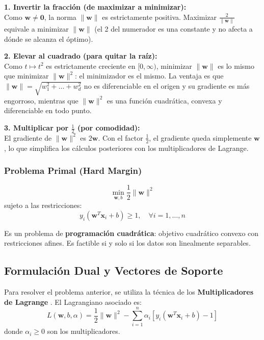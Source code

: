 \documentclass[12pt, a4paper]{article}
\begin{document}
\begin{tcolorbox}[colback=blue!5!white,colframe=blue!75!black,title=\textbf{Nota Aclaratoria: ¿Por qué minimizamos $\frac{1}{2}\|\mathbf{w}\|^2$?}]

\textbf{1. Invertir la fracción (de maximizar a minimizar):}\\
Como $\mathbf{w} \neq \mathbf{0}$, la norma $\|\mathbf{w}\|$ es estrictamente positiva. Maximizar $\frac{2}{\|\mathbf{w}\|}$ equivale a minimizar $\|\mathbf{w}\|$ (el 2 del numerador es una constante y no afecta a dónde se alcanza el óptimo).

\textbf{2. Elevar al cuadrado (para quitar la raíz):}\\
Como $t \mapsto t^2$ es estrictamente creciente en $[0, \infty)$, minimizar $\|\mathbf{w}\|$ es lo mismo que minimizar $\|\mathbf{w}\|^2$: el minimizador es el mismo. La ventaja es que $\|\mathbf{w}\| = \sqrt{w_1^2 + \dots + w_d^2}$ no es diferenciable en el origen y su gradiente es más engorroso, mientras que $\|\mathbf{w}\|^2$ es una función cuadrática, convexa y diferenciable en todo punto.

\textbf{3. Multiplicar por $\frac{1}{2}$ (por comodidad):}\\
El gradiente de $\|\mathbf{w}\|^2$ es $2\mathbf{w}$. Con el factor $\frac{1}{2}$, el gradiente queda simplemente $\mathbf{w}$, lo que simplifica los cálculos posteriores con los multiplicadores de Lagrange.
\end{tcolorbox}

\subsubsection{Problema Primal (Hard Margin)}
\[ \min_{\mathbf{w}, b} \frac{1}{2} \|\mathbf{w}\|^2 \]
sujeto a las restricciones:
\[ y_i(\mathbf{w}^T \mathbf{x}_i + b) \geq 1, \quad \forall i=1, \dots, n \]

\noindent Es un problema de \textbf{programación cuadrática}: objetivo cuadrático convexo con restricciones afines. Es factible si y solo si los datos son linealmente separables.

\subsection{Formulación Dual y Vectores de Soporte}
\noindent Para resolver el problema anterior, se utiliza la técnica de los \textbf{Multiplicadores de Lagrange} \cite{bishop2006pattern}. El Lagrangiano asociado es:
\[ L(\mathbf{w}, b, \alpha) = \frac{1}{2} \|\mathbf{w}\|^2 - \sum_{i=1}^n \alpha_i [y_i(\mathbf{w}^T \mathbf{x}_i + b) - 1] \]
donde $\alpha_i \geq 0$ son los multiplicadores.
\end{document}
